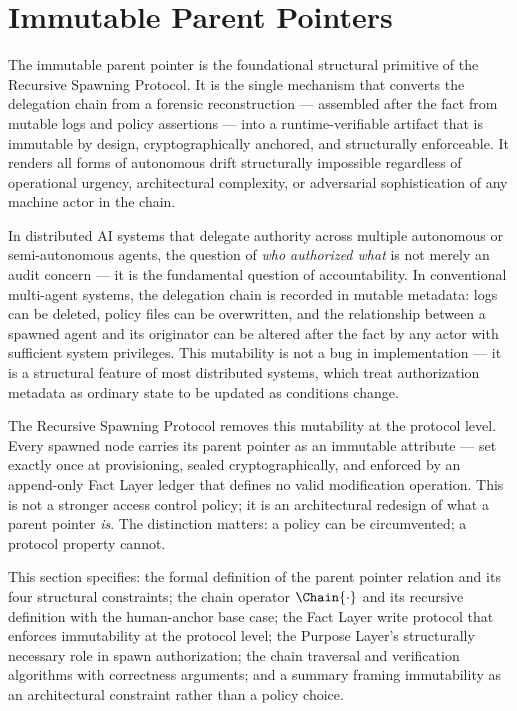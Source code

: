 \section{Immutable Parent Pointers}
\label{sec:immutable-parent-pointers}

The immutable parent pointer is the foundational structural primitive of the Recursive Spawning Protocol. It is the single mechanism that converts the delegation chain from a forensic reconstruction — assembled after the fact from mutable logs and policy assertions — into a runtime-verifiable artifact that is immutable by design, cryptographically anchored, and structurally enforceable. It renders all forms of autonomous drift structurally impossible regardless of operational urgency, architectural complexity, or adversarial sophistication of any machine actor in the chain.

In distributed AI systems that delegate authority across multiple autonomous or semi-autonomous agents, the question of \emph{who authorized what} is not merely an audit concern — it is the fundamental question of accountability. In conventional multi-agent systems, the delegation chain is recorded in mutable metadata: logs can be deleted, policy files can be overwritten, and the relationship between a spawned agent and its originator can be altered after the fact by any actor with sufficient system privileges. This mutability is not a bug in implementation — it is a structural feature of most distributed systems, which treat authorization metadata as ordinary state to be updated as conditions change.

The Recursive Spawning Protocol removes this mutability at the protocol level. Every spawned node carries its parent pointer as an immutable attribute — set exactly once at provisioning, sealed cryptographically, and enforced by an append-only Fact Layer ledger that defines no valid modification operation. This is not a stronger access control policy; it is an architectural redesign of what a parent pointer \emph{is}. The distinction matters: a policy can be circumvented; a protocol property cannot.

This section specifies: the formal definition of the parent pointer relation and its four structural constraints; the chain operator $\Chain{\cdot}$ and its recursive definition with the human-anchor base case; the Fact Layer write protocol that enforces immutability at the protocol level; the Purpose Layer's structurally necessary role in spawn authorization; the chain traversal and verification algorithms with correctness arguments; and a summary framing immutability as an architectural constraint rather than a policy choice.

